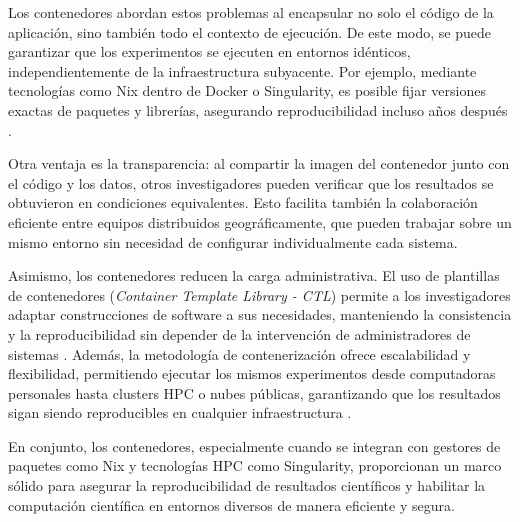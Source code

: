 Los contenedores abordan estos problemas al encapsular no solo el código de la aplicación, sino también todo el contexto de ejecución. De este modo, se puede garantizar que los experimentos se ejecuten en entornos idénticos, independientemente de la infraestructura subyacente. Por ejemplo, mediante tecnologías como Nix dentro de Docker o Singularity, es posible fijar versiones exactas de paquetes y librerías, asegurando reproducibilidad incluso años después \cite{Vaillancourt2020SelfScalingCA}.

Otra ventaja es la transparencia: al compartir la imagen del contenedor junto con el código y los datos, otros investigadores pueden verificar que los resultados se obtuvieron en condiciones equivalentes. Esto facilita también la colaboración eficiente entre equipos distribuidos geográficamente, que pueden trabajar sobre un mismo entorno sin necesidad de configurar individualmente cada sistema.

Asimismo, los contenedores reducen la carga administrativa. El uso de plantillas de contenedores (\textit{Container Template Library - CTL}) permite a los investigadores adaptar construcciones de software a sus necesidades, manteniendo la consistencia y la reproducibilidad sin depender de la intervención de administradores de sistemas \cite{Vaillancourt2020SelfScalingCA}. Además, la metodología de contenerización ofrece escalabilidad y flexibilidad, permitiendo ejecutar los mismos experimentos desde computadoras personales hasta clusters \acs{HPC} o nubes públicas, garantizando que los resultados sigan siendo reproducibles en cualquier infraestructura \cite{Vaillancourt2020SelfScalingCA}.

En conjunto, los contenedores, especialmente cuando se integran con gestores de paquetes como Nix y tecnologías \acs{HPC} como Singularity, proporcionan un marco sólido para asegurar la reproducibilidad de resultados científicos y habilitar la computación científica en entornos diversos de manera eficiente y segura.